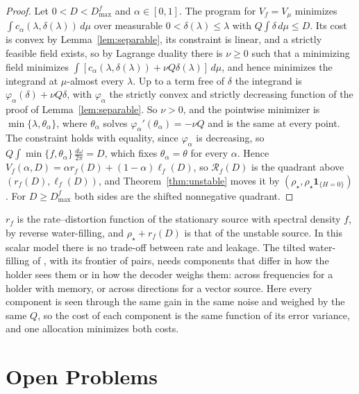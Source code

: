 \documentclass[11pt,onecolumn]{IEEEtran}
\newcommand{\dw}{\tfrac{d\omega}{2\pi}}
\begin{document}
\begin{proof}
Let $0<D<D_{\max}^f$ and $\alpha\in[0,1]$. The program for $V_f=V_\mu$
minimizes $\int c_\alpha(\lambda,\delta(\lambda))\,d\mu$ over measurable
$0<\delta(\lambda)\le\lambda$ with $Q\int\delta\,d\mu\le D$. Its cost is
convex by Lemma~\ref{lem:separable}, its constraint is linear, and a
strictly feasible field exists, so by Lagrange duality there is
$\nu\ge0$ such that a minimizing field minimizes
$\int[c_\alpha(\lambda,\delta(\lambda))+\nu Q\delta(\lambda)]\,d\mu$, and
hence minimizes the integrand at $\mu$-almost every $\lambda$. Up to a
term free of $\delta$ the integrand is $\varphi_\alpha(\delta)+\nu Q\delta$,
with $\varphi_\alpha$ the strictly convex and strictly decreasing function
of the proof of Lemma~\ref{lem:separable}. So $\nu>0$, and the pointwise
minimizer is $\min\{\lambda,\theta_\alpha\}$, where $\theta_\alpha$ solves
$\varphi_\alpha'(\theta_\alpha)=-\nu Q$ and is the same at every point. The
constraint holds with equality, since $\varphi_\alpha$ is decreasing, so
$Q\int\min\{f,\theta_\alpha\}\,\dw=D$, which fixes $\theta_\alpha=\theta$ for
every $\alpha$. Hence $V_f(\alpha,D)=\alpha r_f(D)+(1-\alpha)\ell_f(D)$, so
$\mathcal R_f(D)$ is the quadrant above $(r_f(D),\ell_f(D))$, and
Theorem~\ref{thm:unstable} moves it by
$(\rho_\star,\rho_\star\mathbf 1_{\{H=0\}})$. For $D\ge D_{\max}^f$ both
sides are the shifted nonnegative quadrant.
\end{proof}

$r_f$ is the rate--distortion function of the stationary source with
spectral density $f$, by reverse water-filling, and $\rho_\star+r_f(D)$
is that of the unstable source. In this scalar model there is no
trade-off between rate and leakage. The tilted water-filling of
\cite{part1,part2}, with its frontier of pairs, needs components that
differ in how the holder sees them or in how the decoder weighs them:
across frequencies for a holder with memory, or across directions for a
vector source. Here every component is seen through the same gain in
the same noise and weighed by the same $Q$, so the cost of each
component is the same function of its error variance, and one
allocation minimizes both costs.

\section{Open Problems}
\label{sec:open}
\end{document}

